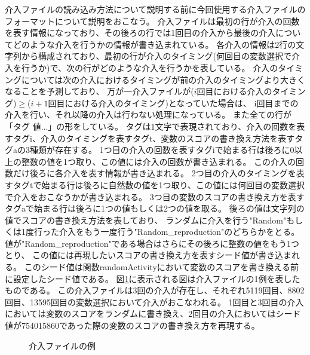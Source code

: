 介入ファイルの読み込み方法について説明する前に今回使用する介入ファイルのフォーマットについて説明をおこなう。
介入ファイルは最初の行が介入の回数を表す情報になっており、その後ろの行では1回目の介入から最後の介入についてどのような介入を行うかの情報が書き込まれている。
各介入の情報は2行の文字列から構成されており、最初の行が介入のタイミング(何回目の変数選択で介入を行うか)で、次の行がどのような介入を行うかを表している。
介入のタイミングについては次の介入におけるタイミングが前の介入のタイミングより大きくなることを予測しており、
万が一介入ファイルが($i$回目における介入のタイミング)$\geq$($i+1$回目における介入のタイミング)となっていた場合は、
i回目までの介入を行い、それ以降の介入は行わない処理になっている。
また全ての行が「タグ 値...」の形をしている。
タグは1文字で表現されており、介入の回数を表すタグi、介入のタイミングを表すタグt、変数のスコアの書き換え方法を表すタグaの3種類が存在する。
1つ目の介入の回数を表すタグiで始まる行は後ろに0以上の整数の値を1つ取り、この値には介入の回数が書き込まれる。
この介入の回数だけ後ろに各介入を表す情報が書き込まれる。
2つ目の介入のタイミングを表すタグtで始まる行は後ろに自然数の値を1つ取り、この値には何回目の変数選択で介入をおこなうかが書き込まれる。
3つ目の変数のスコアの書き換え方を表すタグaで始まる行は後ろに1つの値もしくは2つの値を取る。
後ろの値は文字列の値でスコアの書き換え方法を表しており、
ランダムに介入を行う"Random"もしくは1度行った介入をもう一度行う"Random\_reproduction"のどちらかをとる。
値が"Random\_reproduction"である場合はさらにその後ろに整数の値をもう1つとり、
この値には再現したいスコアの書き換え方を表すシード値が書き込まれる。
このシード値は関数randomActivityにおいて変数のスコアを書き換える前に設定したシード値である。
図\ref{fig:介入ファイルの例}に表示される図は介入ファイルの1例を表したものである。
この介入ファイルは3回の介入が存在し、それぞれ5119回目、8802回目、13595回目の変数選択において介入がおこなわれる。
1回目と3回目の介入においては変数のスコアをランダムに書き換え、2回目の介入においてはシード値が754015860であった際の変数のスコアの書き換え方を再現する。
\begin{figure}[t]
   	\caption{介入ファイルの例}
	\label{fig:介入ファイルの例}
\end{figure}

